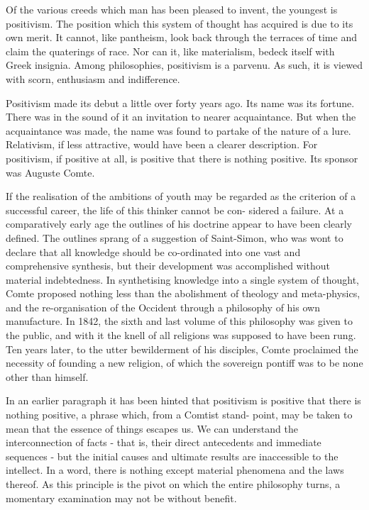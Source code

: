 \documentclass[]{book}
\begin{document}
Of the various creeds which man has been pleased to invent, the youngest
is positivism. The position which this system of thought has acquired is
due to its own merit. It cannot, like pantheism, look back through the
terraces of time and claim the quaterings of race. Nor can it, like
materialism, bedeck itself with Greek insignia. Among philosophies,
positivism is a parvenu. As such, it is viewed with scorn, enthusiasm
and indifference.

Positivism made its debut a little over forty years ago. Its name was
its fortune. There was in the sound of it an invitation to nearer
acquaintance. But when the acquaintance was made, the name was found to
partake of the nature of a lure. Relativism, if less attractive, would
have been a clearer description. For positivism, if positive at all, is
positive that there is nothing positive. Its sponsor was Auguste Comte.

If the realisation of the ambitions of youth may be regarded as the
criterion of a successful career, the life of this thinker cannot be
con- sidered a failure. At a comparatively early age the outlines of his
doctrine appear to have been clearly defined. The outlines sprang of a
suggestion of Saint-Simon, who was wont to declare that all knowledge
should be co-ordinated into one vast and comprehensive synthesis, but
their development was accomplished without material indebtedness. In
synthetising knowledge into a single system of thought, Comte proposed
nothing less than the abolishment of theology and meta-physics, and the
re-organisation of the Occident through a philosophy of his own
manufacture. In 1842, the sixth and last volume of this philosophy was
given to the public, and with it the knell of all religions was supposed
to have been rung. Ten years later, to the utter bewilderment of his
disciples, Comte proclaimed the necessity of founding a new religion, of
which the sovereign pontiff was to be none other than himself.

In an earlier paragraph it has been hinted that positivism is positive
that there is nothing positive, a phrase which, from a Comtist stand-
point, may be taken to mean that the essence of things escapes us. We
can understand the interconnection of facts - that is, their direct
antecedents and immediate sequences - but the initial causes and
ultimate results are inaccessible to the intellect. In a word, there is
nothing except material phenomena and the laws thereof. As this
principle is the pivot on which the entire philosophy turns, a momentary
examination may not be without benefit.
\end{document}
